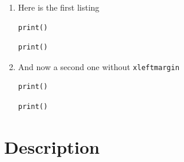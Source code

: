 \documentclass[a4paper,11pt]{article}
\makeatletter
\let\@makecaption@ORI\@makecaption
\let\lst@MakeCaption@ORI\lst@MakeCaption
\newcommand\Original{\let\@makecaption\@makecaption@ORI\let\lst@MakeCaption\lst@MakeCaption@ORI}
\makeatother
\begin{document}
\begin{enumerate}
\item Here is the first listing
\begin{lstlisting}[xleftmargin=30pt,resetmargins=true,caption=Some caption,captionpos=t]
print()
\end{lstlisting}
\begin{lstlisting}[xleftmargin=30pt,resetmargins=true,caption=Some caption,captionpos=b]
print()
\end{lstlisting}

\item And now a second one without \texttt{xleftmargin}
\begin{lstlisting}[xleftmargin=0pt,resetmargins=true,caption=Some caption,captionpos=t]
print()
\end{lstlisting}
\begin{lstlisting}[xleftmargin=0pt,resetmargins=true,caption=Some caption,captionpos=b]
print()
\end{lstlisting}
\end{enumerate}

\clearpage
\section*{Description}


\Original
\end{document}
